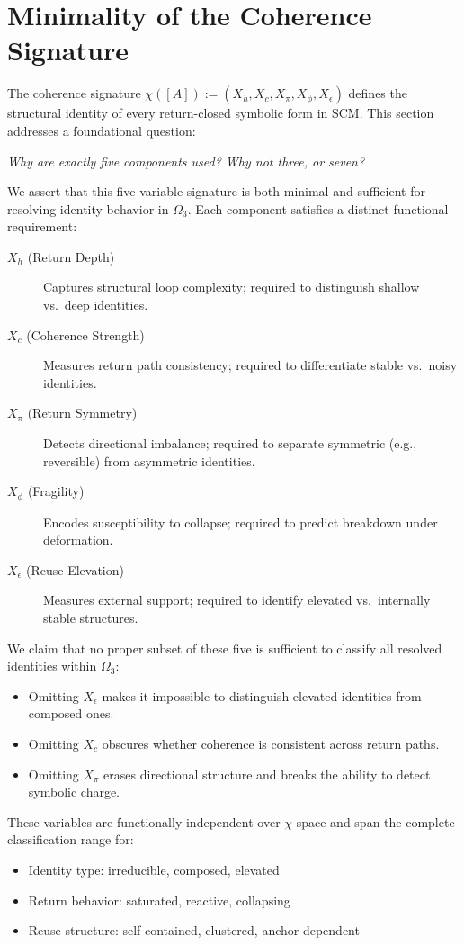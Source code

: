 \section{Minimality of the Coherence Signature} \label{minimality-of-the-coherence-signature}

The coherence signature $\chi([A]) := (X_h, X_c, X_\pi, X_\phi, X_\epsilon)$ defines the structural identity of every return-closed symbolic form in SCM.  
This section addresses a foundational question:

\textit{Why are exactly five components used? Why not three, or seven?}

We assert that this five-variable signature is both minimal and sufficient for resolving identity behavior in $\Omega_3$.  
Each component satisfies a distinct functional requirement:

\begin{description}
  \item[$X_h$ (Return Depth)] Captures structural loop complexity; required to distinguish shallow vs.\ deep identities.
  \item[$X_c$ (Coherence Strength)] Measures return path consistency; required to differentiate stable vs.\ noisy identities.
  \item[$X_\pi$ (Return Symmetry)] Detects directional imbalance; required to separate symmetric (e.g., reversible) from asymmetric identities.
  \item[$X_\phi$ (Fragility)] Encodes susceptibility to collapse; required to predict breakdown under deformation.
  \item[$X_\epsilon$ (Reuse Elevation)] Measures external support; required to identify elevated vs.\ internally stable structures.
\end{description}

We claim that no proper subset of these five is sufficient to classify all resolved identities within $\Omega_3$:

\begin{itemize}
  \item Omitting $X_\epsilon$ makes it impossible to distinguish elevated identities from composed ones.
  \item Omitting $X_c$ obscures whether coherence is consistent across return paths.
  \item Omitting $X_\pi$ erases directional structure and breaks the ability to detect symbolic charge.
\end{itemize}

These variables are functionally independent over $\chi$-space and span the complete classification range for:
\begin{itemize}
  \item Identity type: irreducible, composed, elevated
  \item Return behavior: saturated, reactive, collapsing
  \item Reuse structure: self-contained, clustered, anchor-dependent
\end{itemize}

